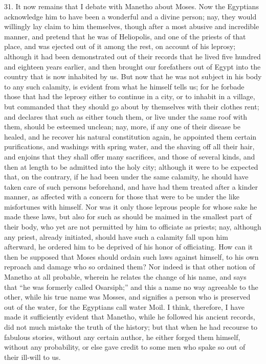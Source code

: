 31. It now remains that I debate with Manetho about Moses. Now the
Egyptians acknowledge him to have been a wonderful and a divine person;
nay, they would willingly lay claim to him themselves, though after a most
abusive and incredible manner, and pretend that he was of Heliopolis, and
one of the priests of that place, and was ejected out of it among the
rest, on account of his leprosy; although it had been demonstrated out of
their records that he lived five hundred and eighteen years earlier, and
then brought our forefathers out of Egypt into the country that is now
inhabited by us. But now that he was not subject in his body to any such
calamity, is evident from what he himself tells us; for he forbade those
that had the leprosy either to continue in a city, or to inhabit in a
village, but commanded that they should go about by themselves with their
clothes rent; and declares that such as either touch them, or live under
the same roof with them, should be esteemed unclean; nay, more, if any one
of their disease be healed, and he recover his natural constitution again,
he appointed them certain purifications, and washings with spring water,
and the shaving off all their hair, and enjoins that they shall offer many
sacrifices, and those of several kinds, and then at length to be admitted
into the holy city; although it were to be expected that, on the contrary,
if he had been under the same calamity, he should have taken care of such
persons beforehand, and have had them treated after a kinder manner, as
affected with a concern for those that were to be under the like
misfortunes with himself. Nor was it only those leprous people for whose
sake he made these laws, but also for such as should be maimed in the
smallest part of their body, who yet are not permitted by him to officiate
as priests; nay, although any priest, already initiated, should have such
a calamity fall upon him afterward, he ordered him to be deprived of his
honor of officiating. How can it then be supposed that Moses should ordain
such laws against himself, to his own reproach and damage who so ordained
them? Nor indeed is that other notion of Manetho at all probable, wherein
he relates the change of his name, and says that ``he was formerly called
Osarsiph;'' and this a name no way agreeable to the other, while his true
name was Mosses, and signifies a person who is preserved out of the water,
for the Egyptians call water Moil. I think, therefore, I have made it
sufficiently evident that Manetho, while he followed his ancient records,
did not much mistake the truth of the history; but that when he had
recourse to fabulous stories, without any certain author, he either forged
them himself, without any probability, or else gave credit to some men who
spake so out of their ill-will to us.

